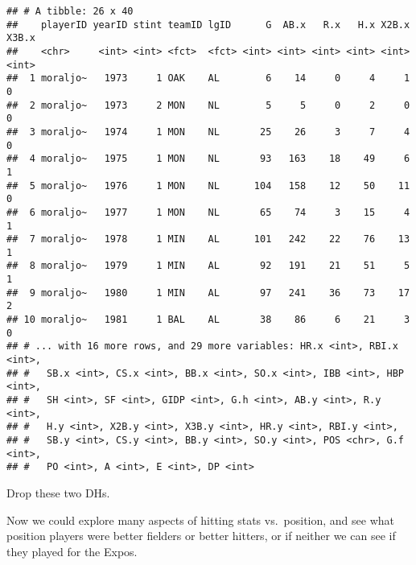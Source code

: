 \documentclass[]{book}
\newenvironment{Shaded}{\begin{snugshade}}{\end{snugshade}}
\newcommand{\KeywordTok}[1]{\textcolor[rgb]{0.13,0.29,0.53}{\textbf{#1}}}
\newcommand{\StringTok}[1]{\textcolor[rgb]{0.31,0.60,0.02}{#1}}
\newcommand{\OperatorTok}[1]{\textcolor[rgb]{0.81,0.36,0.00}{\textbf{#1}}}
\newcommand{\NormalTok}[1]{#1}
\begin{document}
\begin{verbatim}
## # A tibble: 26 x 40
##    playerID yearID stint teamID lgID      G  AB.x   R.x   H.x X2B.x X3B.x
##    <chr>     <int> <int> <fct>  <fct> <int> <int> <int> <int> <int> <int>
##  1 moraljo~   1973     1 OAK    AL        6    14     0     4     1     0
##  2 moraljo~   1973     2 MON    NL        5     5     0     2     0     0
##  3 moraljo~   1974     1 MON    NL       25    26     3     7     4     0
##  4 moraljo~   1975     1 MON    NL       93   163    18    49     6     1
##  5 moraljo~   1976     1 MON    NL      104   158    12    50    11     0
##  6 moraljo~   1977     1 MON    NL       65    74     3    15     4     1
##  7 moraljo~   1978     1 MIN    AL      101   242    22    76    13     1
##  8 moraljo~   1979     1 MIN    AL       92   191    21    51     5     1
##  9 moraljo~   1980     1 MIN    AL       97   241    36    73    17     2
## 10 moraljo~   1981     1 BAL    AL       38    86     6    21     3     0
## # ... with 16 more rows, and 29 more variables: HR.x <int>, RBI.x <int>,
## #   SB.x <int>, CS.x <int>, BB.x <int>, SO.x <int>, IBB <int>, HBP <int>,
## #   SH <int>, SF <int>, GIDP <int>, G.h <int>, AB.y <int>, R.y <int>,
## #   H.y <int>, X2B.y <int>, X3B.y <int>, HR.y <int>, RBI.y <int>,
## #   SB.y <int>, CS.y <int>, BB.y <int>, SO.y <int>, POS <chr>, G.f <int>,
## #   PO <int>, A <int>, E <int>, DP <int>
\end{verbatim}

Drop these two DHs.

\begin{Shaded}
\end{Shaded}

Now we could explore many aspects of hitting stats vs.~position, and see
what position players were better fielders or better hitters, or if
neither we can see if they played for the Expos.
\end{document}
